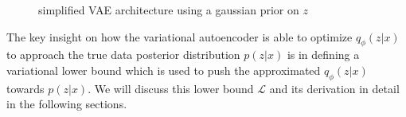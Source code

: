 \begin{figure}[h]
  \centering
  
  \caption[VAE architecture]{simplified VAE architecture using a gaussian prior on $z$}
  \label{fig:vae_architecture}
\end{figure}

The key insight on how the variational autoencoder is able to optimize $q_\phi(z|x)$ to approach the true data posterior distribution $p(z|x)$ is in defining a variational lower bound which is used to push the approximated $q_\phi(z|x)$ towards $p(z|x)$. We will discuss this lower bound $\mathcal{L}$ and its derivation in detail in the following sections.

\newpage










